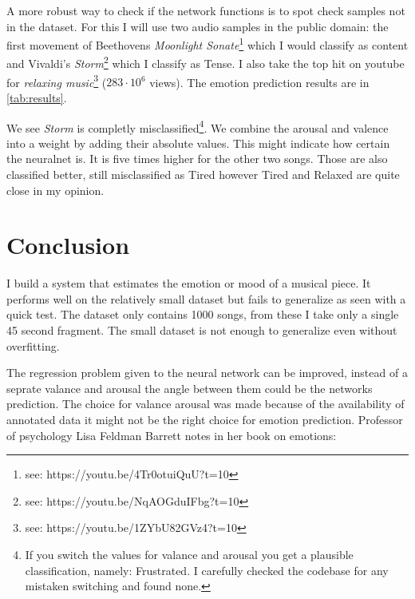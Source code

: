 \documentclass[lang=en, hanging-titles=true]{skrapport}
\begin{document}
A more robust way to check if the network functions is to spot check samples not in the dataset. For this I will use two audio samples in the public domain: the first movement of Beethovens \textit{Moonlight Sonate}\footnote{see: https://youtu.be/4Tr0otuiQuU?t=10} which I would classify as content and Vivaldi's \textit{Storm}\footnote{see: https://youtu.be/NqAOGduIFbg?t=10} which I classify as Tense. I also take the top hit on youtube for \textit{relaxing music}\footnote{see: https://youtu.be/1ZYbU82GVz4?t=10} ($283\cdot10^6$ views). The emotion prediction results are in \cref{tab:results}.


We see \textit{Storm} is completly misclassified\footnote{If you switch the values for valance and arousal you get a plausible classification, namely: Frustrated. I carefully checked the codebase for any mistaken switching and found none.}. We combine the arousal and valence into a weight by adding their absolute values. This might indicate how certain the neuralnet is. It is five times higher for the other two songs. Those are also classified better, still misclassified as Tired however Tired and Relaxed are quite close in my opinion.

\section{Conclusion}
I build a system that estimates the emotion or mood of a musical piece. It performs well on the relatively small dataset but fails to generalize as seen with a quick test. The dataset only contains 1000 songs, from these I take only a single 45 second fragment. The small dataset is not enough to generalize even without overfitting. 

The regression problem given to the neural network can be improved, instead of a seprate valance and arousal the angle between them could be the networks prediction. The choice for valance arousal was made because of the availability of annotated data it might not be the right choice for emotion prediction. Professor of psychology Lisa Feldman Barrett\cite{feldman} notes in her book on emotions:
\end{document}

